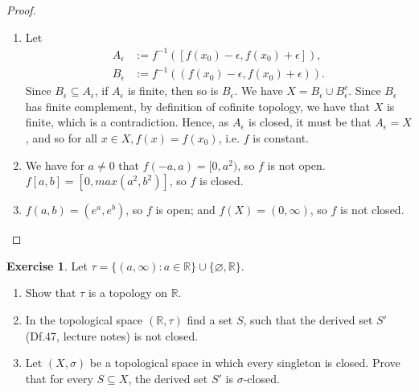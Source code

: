 \documentclass[12pt]{extarticle}
\newcommand{\set}[1]{\{#1\}}
\newcommand{\R}{\mathbb{R}}
\newcommand{\<}{\langle}
\renewcommand{\>}{\rangle}
\renewcommand{\emptyset}{\varnothing}
\theoremstyle{definition}
\newtheorem{exercise}{Exercise}
\begin{document}
\begin{proof}
  \begin{enumerate}
  \item
    Let
    \begin{align*}
      A_{\epsilon} &:= f^{-1}([f(x_0) - \epsilon, f(x_0) + \epsilon]), \\
      B_{\epsilon} &:= f^{-1}((f(x_0) - \epsilon, f(x_0) + \epsilon)).
    \end{align*}
    Since $B_{\epsilon} \subseteq A_{\epsilon}$, if $A_{\epsilon}$ is finite, then so is $B_{\epsilon}$. We have $X = B_{\epsilon} \cup B_{\epsilon}^c$. Since $B_{\epsilon}$ has finite complement, by definition of cofinite topology, we have that $X$ is finite, which is a contradiction. Hence, as $A_{\epsilon}$ is closed, it must be that $A_{\epsilon} = X$, and so for all $x \in X, f(x) = f(x_0)$, i.e. $f$ is constant.
  \item
    We have for $a \neq 0$ that $f(-a,a) = [0,a^2)$, so $f$ is not open. $f[a,b] = [0, max(a^2,b^2)]$, so $f$ is closed. 
    \item
      $f(a,b) = (e^a, e^b)$, so $f$ is open; and $f(X) = (0, \infty)$, so $f$ is not closed.
  \end{enumerate}
\end{proof}
\begin{exercise}
  Let $\tau = \set{(a, \infty): a \in \R} \cup \set{\emptyset, \R}$.
  \begin{enumerate}
  \item
    Show that $\tau$ is a topology on $\R$.
  \item
    In the topological space $(\R, \tau)$ find a set $S$, such that the derived set $S'$ (Df.47, lecture notes) is not closed.
  \item
    Let $(X, \sigma)$ be a topological space in which every singleton is closed. Prove that for every $S \subseteq X$, the derived set $S'$ is $\sigma$-closed. 
  \end{enumerate}
\end{exercise}
\end{document}
